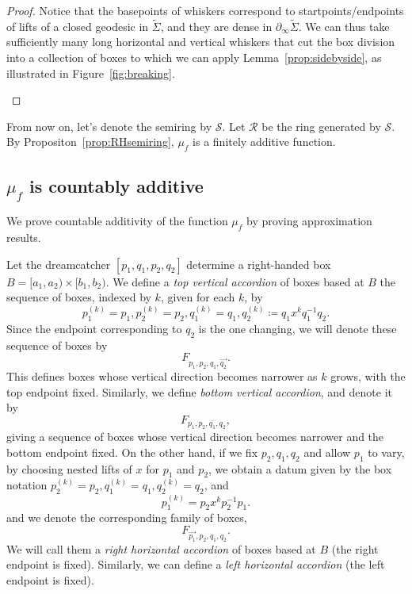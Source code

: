 \begin{proof}
Notice that the basepoints of whiskers correspond to startpoints/endpoints of lifts of a closed geodesic in $\tilde{\Sigma}$, and they are dense in $\partial_{\infty}\tilde{\Sigma}$. We can thus take sufficiently many long horizontal and vertical whiskers that cut the box division into a collection of boxes to which we can apply Lemma~\ref{prop:sidebyside}, as illustrated in Figure~\ref{fig:breaking}. \qedhere
\begin{figure}
\end{figure}
\end{proof}

From now on, let's denote the semiring by $\mathcal{S}$.
Let $\mathcal{R}$ be the ring generated by $\mathcal{S}$.
By Propositon~\ref{prop:RHsemiring}, $\mu_{f}$ is a finitely additive function.


\subsection{$\mu_{f}$ is countably additive}
\label{sec:countable-additivity}

We prove countable additivity of the function $\mu_{f}$ by
proving approximation results.



\begin{definition}
Let the dreamcatcher $[p_1,q_1,p_2,q_2]$ determine a right-handed box $B = [a_1,a_2) \times [b_1,b_2)$.
We define a \emph{top vertical accordion} of boxes based at $B$ the sequence of boxes, indexed by $k$, given for each $k$, by
\[
p_1^{(k)}=p_1,p_2^{(k)}=p_2,q_1^{(k)}=q_1,q_2^{(k)} \coloneqq q_1 x^k q_1^{-1}q_2.
\]
Since the endpoint corresponding to $q_2$ is the one changing, we will denote these sequence of boxes by
\[
F_{p_1,p_2,q_1,\vec{q_2}}.
\]
This defines boxes whose vertical direction becomes narrower as $k$ grows, with the top endpoint fixed. 
Similarly, we define \emph{bottom vertical accordion}, and denote it by 
\[
F_{p_1,p_2,\bar{q_1},q_2},
\]
giving a sequence of boxes whose vertical direction becomes narrower and the bottom endpoint fixed.
On the other hand, if we fix $p_2,q_1,q_2$ and allow $p_1$ to vary, by choosing nested lifts of $x$ for $p_1$ and $p_2$, we obtain a datum given by the box notation $p_2^{(k)}=p_2,q_1^{(k)}=q_1,q_2^{(k)}=q_2$, and
\[
p_1^{(k)} = p_2 x^k p_2^{-1} p_1.
\]
and we denote the corresponding family of boxes,
\[
F_{\vec{p_1},p_2,q_1,q_2}.
\]
We will call them a \emph{right horizontal accordion} of boxes based at $B$ (the right endpoint is fixed).
Similarly, we can define a \emph{left horizontal accordion} (the left endpoint is fixed).
\end{definition}

